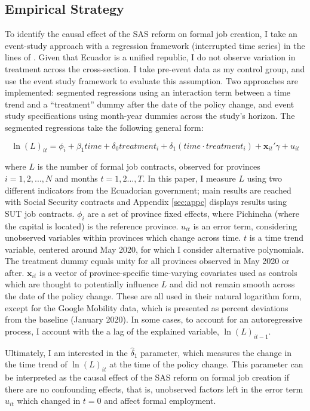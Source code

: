 \documentclass[11pt,a4paper]{article}\usepackage[]{graphicx}\usepackage[]{xcolor}
\begin{document}
\subsection{Empirical Strategy}

To identify the causal effect of the SAS reform on formal job creation, I take an event-study approach with a regression framework (interrupted time series) in the lines of \textcite{Taljaard.2014}. Given that Ecuador is a unified republic, I do not observe variation in treatment across the cross-section. I take pre-event data as my control group, and use the event study framework to evaluate this assumption. Two approaches are implemented: segmented regressions using an interaction term between a time trend and a ``treatment'' dummy after the date of the policy change, and event study specifications using month-year dummies across the study's horizon. The segmented regressions take the following general form:

\begin{equation}
\label{eqn:seg}
\ln(L)_{it} = \phi_i + \beta_1 time + \delta_0 treatment_{i} + \delta_1(time \cdot treatment_{i}) + \mathbf{x}_{it}'\gamma + u_{it}
\end{equation}

where $L$ is the number of formal job contracts, observed for provinces $i = 1, 2, ..., N$ and months $t = 1,2 ..., T$. In this paper, I measure $L$ using two different indicators from the Ecuadorian government; main results are reached with Social Security contracts and Appendix \ref{sec:appc} displays results using SUT job contracts. $\phi_i$ are a set of province fixed effects, where Pichincha (where the capital is located) is the reference province. $u_{it}$ is an error term, considering unobserved variables within provinces which change across time. $t$ is a time trend variable, centered around May 2020, for which I consider alternative polynomials. The treatment dummy equals unity for all provinces observed in May 2020 or after. $\mathbf{x}_{it}$ is a vector of province-specific time-varying covariates used as controls which are thought to potentially influence $L$ and did not remain smooth across the date of the policy change. These are all used in their natural logarithm form, except for the Google Mobility data, which is presented as percent deviations from the baseline (January 2020). In some cases, to account for an autoregressive process, I account with the a lag of the explained variable, $\ln(L)_{it-1}$.

Ultimately, I am interested in the $\hat{\delta}_1 $ parameter, which measures the change in the time trend of $\ln(L)_{it}$ at the time of the policy change. This parameter can be interpreted as the causal effect of the SAS reform on formal job creation if there are no confounding effects, that is, unobserved factors left in the error term $u_{it}$ which changed in $t = 0$ and affect formal employment.
\end{document}

